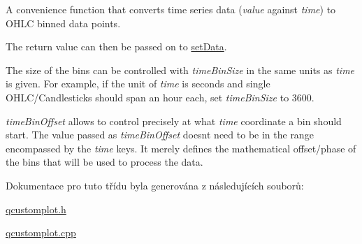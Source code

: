 A convenience function that converts time series data ({\itshape value} against {\itshape time}) to O\+H\+L\+C binned data points. 

The return value can then be passed on to \hyperlink{classQCPFinancial_adf12a86082f1e488df6a4e8603f8fd6d}{set\+Data}.

The size of the bins can be controlled with {\itshape time\+Bin\+Size} in the same units as {\itshape time} is given. For example, if the unit of {\itshape time} is seconds and single O\+H\+L\+C/\+Candlesticks should span an hour each, set {\itshape time\+Bin\+Size} to 3600.

{\itshape time\+Bin\+Offset} allows to control precisely at what {\itshape time} coordinate a bin should start. The value passed as {\itshape time\+Bin\+Offset} doesn\textquotesingle{}t need to be in the range encompassed by the {\itshape time} keys. It merely defines the mathematical offset/phase of the bins that will be used to process the data. 

Dokumentace pro tuto třídu byla generována z následujících souborů\+:\begin{DoxyCompactItemize}
\item 
\hyperlink{qcustomplot_8h}{qcustomplot.\+h}\item 
\hyperlink{qcustomplot_8cpp}{qcustomplot.\+cpp}\end{DoxyCompactItemize}
